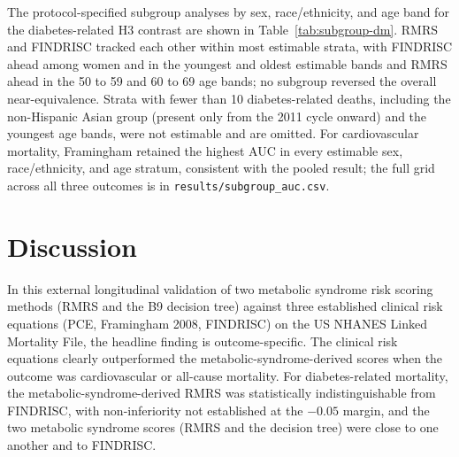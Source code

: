 \documentclass[11pt]{article}
\begin{document}


The protocol-specified subgroup analyses by sex, race/ethnicity, and age band for the diabetes-related H3 contrast are shown in Table~\ref{tab:subgroup-dm}. RMRS and FINDRISC tracked each other within most estimable strata, with FINDRISC ahead among women and in the youngest and oldest estimable bands and RMRS ahead in the 50 to 59 and 60 to 69 age bands; no subgroup reversed the overall near-equivalence. Strata with fewer than 10 diabetes-related deaths, including the non-Hispanic Asian group (present only from the 2011 cycle onward) and the youngest age bands, were not estimable and are omitted. For cardiovascular mortality, Framingham retained the highest AUC in every estimable sex, race/ethnicity, and age stratum, consistent with the pooled result; the full grid across all three outcomes is in \texttt{results/subgroup\_auc.csv}.



\section*{Discussion}

In this external longitudinal validation of two metabolic syndrome risk scoring methods (RMRS and the B9 decision tree) against three established clinical risk equations (PCE, Framingham 2008, FINDRISC) on the US NHANES Linked Mortality File, the headline finding is outcome-specific. The clinical risk equations clearly outperformed the metabolic-syndrome-derived scores when the outcome was cardiovascular or all-cause mortality. For diabetes-related mortality, the metabolic-syndrome-derived RMRS was statistically indistinguishable from FINDRISC, with non-inferiority not established at the $-0.05$ margin, and the two metabolic syndrome scores (RMRS and the decision tree) were close to one another and to FINDRISC.
\end{document}
